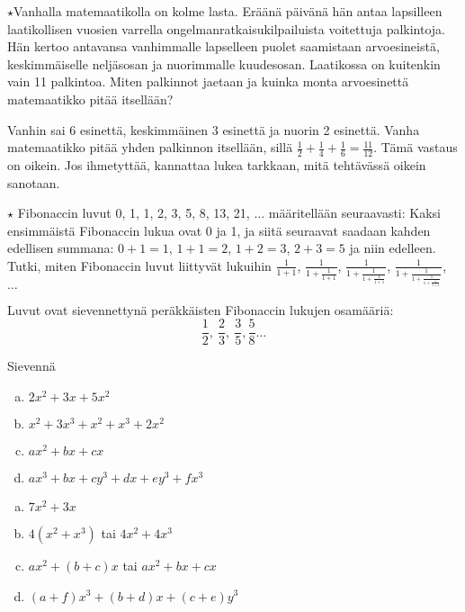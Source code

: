 \begin{tehtavasivu}
\begin{tehtava}
	$\star $Vanhalla matemaatikolla on kolme lasta. Eräänä päivänä hän antaa lapsilleen laatikollisen vuosien varrella ongelmanratkaisukilpailuista voitettuja palkintoja. Hän kertoo antavansa vanhimmalle lapselleen puolet saamistaan arvoesineistä, keskimmäiselle neljäsosan ja nuorimmalle kuudesosan. Laatikossa on kuitenkin vain 11 palkintoa. Miten  palkinnot jaetaan ja kuinka monta arvoesinettä matemaatikko pitää itsellään?
	\begin{vastaus}
		Vanhin sai 6 esinettä, keskimmäinen 3 esinettä ja nuorin 2 esinettä. Vanha
		matemaatikko pitää yhden palkinnon itsellään, sillä $\frac{1}{2} + \frac{1}{4}
		+ \frac{1}{6} = \frac{11}{12}$. Tämä vastaus on oikein. Jos ihmetyttää, kannattaa lukea tarkkaan, mitä tehtävässä oikein sanotaan.
	\end{vastaus}
\end{tehtava}

\begin{tehtava}
	$\star$ Fibonaccin luvut 0, 1, 1, 2, 3, 5, 8, 13, 21, $\ldots$ määritellään seuraavasti: Kaksi ensimmäistä
	Fibonaccin lukua ovat 0 ja 1, ja siitä seuraavat saadaan kahden
	edellisen summana: $0+1=1$, $1+1=2$, $1+2 = 3$, $2+3=5 $
	ja niin edelleen. 
	Tutki, miten Fibonaccin luvut liittyvät lukuihin
	$ \frac{1}{1+1}$, $\frac{1}{1+\frac{1}{1+1}}$, 
	$\frac{1}{1+\frac{1}{1+\frac{1}{1+1}}}$, 
	$\frac{1}{1+\frac{1}{1+\frac{1}{1+\frac{1}{1+1}}}}$, $\ldots\ $
	\begin{vastaus}
		Luvut ovat sievennettynä peräkkäisten Fibonaccin
		lukujen osamääriä:
		\[\frac{1}{2}, \ \frac{2}{3}, \ \frac{3}{5}, \frac{5}{8} \ldots  \]
	\end{vastaus}
\end{tehtava}

\begin{tehtava}
Sievennä
	\begin{enumerate}[a)]
	\item $2x^2+3x+5x^2$
	\item $x^2+3x^3+x^2+x^3+2x^2$
	\item $ax^2+bx+cx$
	\item $ax^3+bx+cy^3+dx+ey^3+fx^3$
	\end{enumerate}

\begin{vastaus}
	\begin{enumerate}[a)]
	\item $7x^2+3x$
	\item $4(x^2+x^3)$ tai $4x^2+4x^3$
	\item $ax^2+(b+c)x$ tai $ax^2+bx+cx$
	\item $(a+f)x^3+(b+d)x+(c+e)y^3$
	\end{enumerate}
\end{vastaus}
\end{tehtava}


\end{tehtavasivu}
